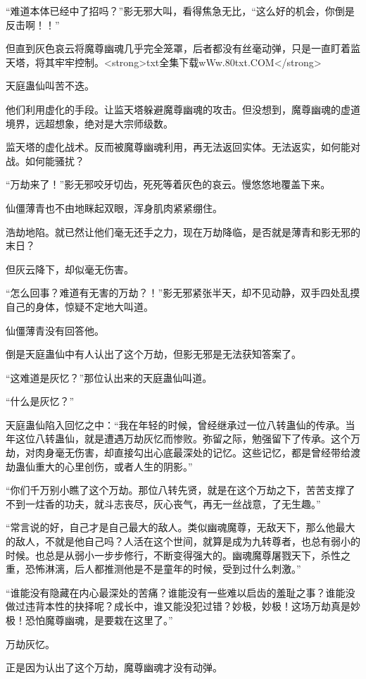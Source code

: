 \begin{this_body}
“难道本体已经中了招吗？”影无邪大叫，看得焦急无比，“这么好的机会，你倒是反击啊！！”

但直到灰色哀云将魔尊幽魂几乎完全笼罩，后者都没有丝毫动弹，只是一直盯着监天塔，将其牢牢控制。<strong>txt全集下载wWw.80txt.COM</strong>

天庭蛊仙叫苦不迭。

他们利用虚化的手段。让监天塔躲避魔尊幽魂的攻击。但没想到，魔尊幽魂的虚道境界，远超想象，绝对是大宗师级数。

监天塔的虚化战术。反而被魔尊幽魂利用，再无法返回实体。无法返实，如何能对战。如何能骚扰？

“万劫来了！”影无邪咬牙切齿，死死等着灰色的哀云。慢悠悠地覆盖下来。

仙僵薄青也不由地眯起双眼，浑身肌肉紧紧绷住。

浩劫地陷。就已然让他们毫无还手之力，现在万劫降临，是否就是薄青和影无邪的末日？

但灰云降下，却似毫无伤害。

“怎么回事？难道有无害的万劫？！”影无邪紧张半天，却不见动静，双手四处乱摸自己的身体，惊疑不定地大叫道。

仙僵薄青没有回答他。

倒是天庭蛊仙中有人认出了这个万劫，但影无邪是无法获知答案了。

“这难道是灰忆？”那位认出来的天庭蛊仙叫道。

“什么是灰忆？”

天庭蛊仙陷入回忆之中：“我在年轻的时候，曾经继承过一位八转蛊仙的传承。当年这位八转蛊仙，就是遭遇万劫灰忆而惨败。弥留之际，勉强留下了传承。这个万劫，对肉身毫无伤害，却直接勾出心底最深处的记忆。这些记忆，都是曾经带给渡劫蛊仙重大的心里创伤，或者人生的阴影。”

“你们千万别小瞧了这个万劫。那位八转先贤，就是在这个万劫之下，苦苦支撑了不到一炷香的功夫，就斗志丧尽，灰心丧气，再无一丝战意，了无生趣。”

“常言说的好，自己才是自己最大的敌人。类似幽魂魔尊，无敌天下，那么他最大的敌人，不就是他自己吗？人活在这个世间，就算是成为九转尊者，也总有弱小的时候。也总是从弱小一步步修行，不断变得强大的。幽魂魔尊屠戮天下，杀性之重，恐怖淋漓，后人都推测他是不是童年的时候，受到过什么刺激。”

“谁能没有隐藏在内心最深处的苦痛？谁能没有一些难以启齿的羞耻之事？谁能没做过违背本性的抉择呢？成长中，谁又能没犯过错？妙极，妙极！这场万劫真是妙极！恐怕魔尊幽魂，是要栽在这里了。”

万劫灰忆。

正是因为认出了这个万劫，魔尊幽魂才没有动弹。


\end{this_body}
